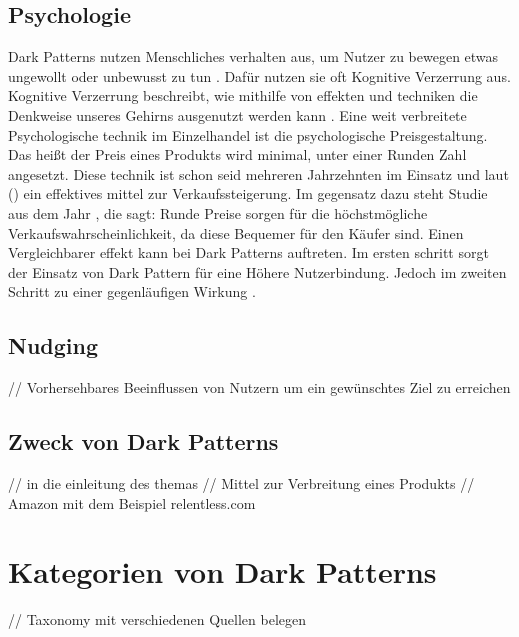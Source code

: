 \documentclass[conference,compsoc,final,a4paper]{IEEEtran}
\begin{document}
\subsection{Psychologie}
\label{chap:Psychologie}
Dark Patterns nutzen Menschliches verhalten aus, um Nutzer zu bewegen etwas ungewollt oder unbewusst zu tun \autocite{Brignull}. Dafür nutzen sie oft Kognitive Verzerrung aus. Kognitive Verzerrung beschreibt, wie mithilfe von effekten und techniken die Denkweise unseres Gehirns ausgenutzt werden kann \autocite{Mathur2019}.
Eine weit verbreitete Psychologische technik im Einzelhandel ist die psychologische Preisgestaltung. Das heißt der Preis eines Produkts wird minimal, unter einer Runden Zahl angesetzt. Diese technik ist schon seid mehreren Jahrzehnten im Einsatz und laut \citeauthor{Bizer_2005} () ein effektives mittel zur Verkaufssteigerung. Im gegensatz dazu steht \citeauthor{Wieseke_2015} Studie aus dem Jahr , die sagt: Runde Preise sorgen für die höchstmögliche Verkaufswahrscheinlichkeit, da diese Bequemer für den Käufer sind. Einen Vergleichbarer effekt kann bei Dark Patterns auftreten. Im ersten schritt sorgt der Einsatz von Dark Pattern für eine Höhere Nutzerbindung. Jedoch im zweiten Schritt zu einer gegenläufigen Wirkung \autocite*{M.Bhoot2020}.
\subsection{Nudging}
// Vorhersehbares Beeinflussen von Nutzern um ein gewünschtes Ziel zu erreichen

\subsection{Zweck von Dark Patterns}
// in die einleitung des themas
// Mittel zur Verbreitung eines Produkts
// Amazon mit dem Beispiel relentless.com

\newpage
\section{Kategorien von Dark Patterns}
// Taxonomy mit verschiedenen Quellen belegen \autocite*{Gray_2018,M.Bhoot2020,Brignull}
\end{document}
